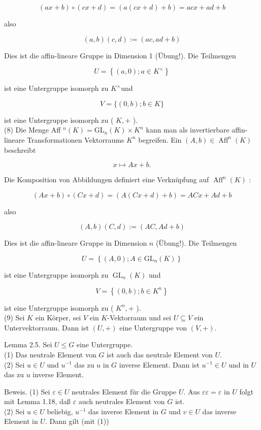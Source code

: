 \documentclass[10pt, letterpaper]{article}
\begin{document}
$$
(a x+b) \circ(c x+d)=(a(c x+d)+b)=a c x+a d+b
$$

also

$$
(a, b)(c, d):=(a c, a d+b)
$$

Dies ist die affin-lineare Gruppe in Dimension 1 (Übung!). Die Teilmengen

$$
U=\left\{(a, 0) ; a \in K^{\times}\right\}
$$

ist eine Untergruppe isomorph zu $K^{\times}$und

$$
V=\{(0, b) ; b \in K\}
$$

ist eine Untergruppe isomorph zu ( $K,+$ ).\\
(8) Die Menge Aff ${ }^{n}(K)=\mathrm{GL}_{n}(K) \times K^{n}$ kann man als invertierbare affin-lineare Transformationen Vektorraums $K^{n}$ begreifen. Ein $(A, b) \in \operatorname{Aff}^{n}(K)$ beschreibt

$$
x \mapsto A x+b .
$$

Die Komposition von Abbildungen definiert eine Verknüpfung auf $\operatorname{Aff}^{n}(K)$ :

$$
(A x+b) \circ(C x+d)=(A(C x+d)+b)=A C x+A d+b
$$

also

$$
(A, b)(C, d):=(A C, A d+b)
$$

Dies ist die affin-lineare Gruppe in Dimension $n$ (Übung!). Die Teilmengen

$$
U=\left\{(A, 0) ; A \in \mathrm{GL}_{n}(K)\right\}
$$

ist eine Untergruppe isomorph zu $\operatorname{GL}_{n}(K)$ und

$$
V=\left\{(0, b) ; b \in K^{n}\right\}
$$

ist eine Untergruppe isomorph zu ( $K^{n},+$ ).\\
(9) Sei $K$ ein Körper, sei $V$ ein $K$-Vektorraum und sei $U \subseteq V$ ein Untervektorraum. Dann ist $(U,+)$ eine Untergruppe von $(V,+)$.

Lemma 2.5. Sei $U \leq G$ eine Untergruppe.\\
(1) Das neutrale Element von $G$ ist auch das neutrale Element von $U$.\\
(2) Sei $u \in U$ und $u^{-1}$ das zu $u$ in $G$ inverse Element. Dann ist $u^{-1} \in U$ und in $U$ das zu $u$ inverse Element.

Beweis. (1) Sei $\varepsilon \in U$ neutrales Element für die Gruppe $U$. Aus $\varepsilon \varepsilon=\varepsilon$ in $U$ folgt mit Lemma 1.18, daß $\varepsilon$ auch neutrales Element von $G$ ist.\\
(2) Sei $u \in U$ beliebig, $u^{-1}$ das inverse Element in $G$ und $v \in U$ das inverse Element in $U$. Dann gilt (mit (1))
\end{document}
